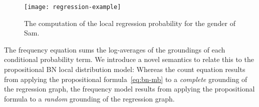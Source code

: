 \documentclass{article}
\begin{document}
\begin{figure}[t]
\begin{center}
\texttt{[image: regression-example]}
\caption{%
The computation of the local regression probability for the gender of Sam.
 \label{fig:regress-example}}
\end{center}
\end{figure}
The frequency equation sums the log-averages of the groundings of each conditional probability term. We introduce a novel semantics to relate this to the propositional BN local distribution model: Whereas the count equation  results from applying the propositional formula~\eqref{eq:bn-mb} to a {\em complete} grounding of the regression graph, the frequency model results from applying the propositional formula to a {\em random} grounding of the regression graph.

%


%
\end{document}
